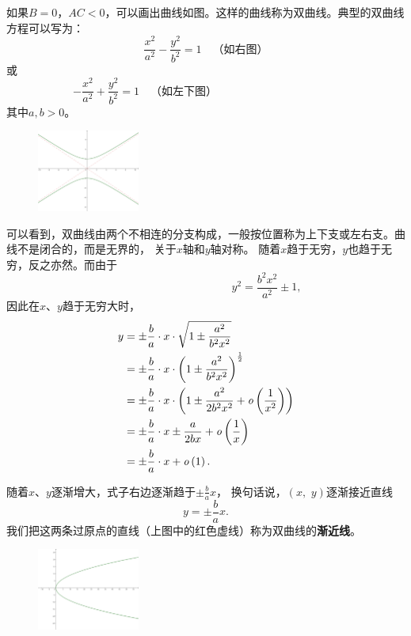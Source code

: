 \documentclass[12pt,UTF8]{ctexbook}
\begin{document}
如果$B = 0$，$AC < 0$，可以画出曲线如图。这样的曲线称为双曲线。典型的双曲线方程可以写为：
$$ \frac{x^2}{a^2} - \frac{y^2}{b^2} = 1 \quad \mbox{（如右图）}$$
或
$$ - \frac{x^2}{a^2} + \frac{y^2}{b^2} = 1  \quad \mbox{（如左下图）} \qquad  \qquad  \qquad  \qquad \;\: \quad \phantom{123}$$
其中$a,b>0$。

\begin{figure} 
    \vspace{-28pt}
    \flushright
    \includegraphics[width=0.3\textwidth]{tu/双曲线2.png}
\end{figure}

可以看到，双曲线由两个不相连的分支构成，一般按位置称为上下支或左右支。曲线不是闭合的，而是无界的，
关于$x$轴和$y$轴对称。
随着$x$趋于无穷，$y$也趋于无穷，反之亦然。而由于
$$ \phantom{123455}\qquad \qquad \qquad \qquad y^2 = \frac{b^2x^2}{a^2} \pm 1, $$
因此在$x$、$y$趋于无穷大时，
\begin{align*}
    y &= \pm \frac{b}{a} \cdot x \cdot \sqrt{1 \pm \frac{a^2}{b^2x^2}} \\ 
    &= \pm \frac{b}{a} \cdot x \cdot \left(1 \pm \frac{a^2}{b^2x^2}\right)^{\frac{1}{2}} \\
    &= \pm \frac{b}{a} \cdot x \cdot \left(1 \pm \frac{a^2}{2b^2x^2} + \mathit{o}\left(\frac{1}{x^2}\right) \right)\\
    &= \pm \frac{b}{a} \cdot x \pm \frac{a}{2bx} + \mathit{o}\left(\frac{1}{x}\right) \\
    &= \pm \frac{b}{a} \cdot x + \mathit{o}\left(1\right).
\end{align*}

随着$x$、$y$逐渐增大，式子右边逐渐趋于$\displaystyle\pm \frac{b}{a} x$，
换句话说，$(x, \,\, y)$逐渐接近直线
$$ y = \pm \frac{b}{a}x. $$
我们把这两条过原点的直线（上图中的红色虚线）称为双曲线的\textbf{渐近线}。

\begin{figure} %
    \flushright
    \includegraphics[width=0.3\textwidth]{tu/抛物线1.png}
\end{figure}
\end{document}
